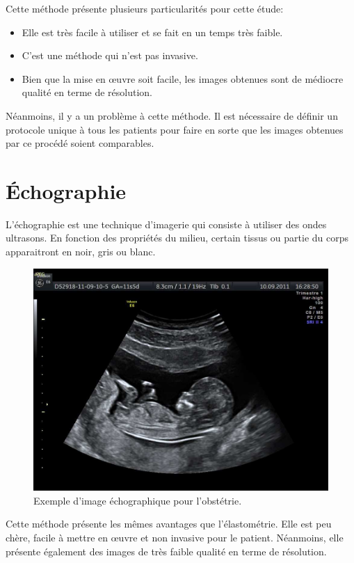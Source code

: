 Cette méthode présente plusieurs particularités pour cette étude:

\begin{itemize}
\item Elle est très facile à utiliser et se fait en un temps très faible. 
\item C'est une méthode qui n'est pas invasive.
\item Bien que la mise en œuvre soit facile, les images obtenues sont de médiocre qualité en terme de résolution.
\end{itemize}

Néanmoins, il y a un problème à cette méthode. Il est nécessaire de définir un protocole unique à tous les patients pour faire en sorte que les images obtenues par ce procédé soient comparables.

 
\section{Échographie}

L'échographie est une technique d'imagerie qui consiste à utiliser des ondes ultrasons. En fonction des propriétés du milieu, certain tissus ou partie du corps apparaitront en noir, gris ou blanc. 

\begin{figure}[H]
\centering
    \includegraphics[scale=0.6,angle=0]{Images/Echographie-profil.jpg}
    \caption{Exemple d'image échographique pour l'obstétrie.}
    \label{fig:Echographie}
\end{figure}

Cette méthode présente les mêmes avantages que l'élastométrie. Elle est peu chère, facile à mettre en œuvre et non invasive pour le patient. Néanmoins, elle présente également des images de très faible qualité en terme de résolution.


